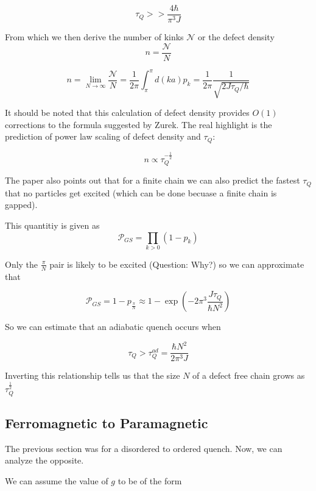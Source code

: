 \documentclass{article}
\begin{document}
\begin{equation}
    \tau_Q >> \frac{4\hbar }{\pi^3 J}
\end{equation}

From which we then derive the number of kinks $\mathcal{N}$ or the defect density $$n = \frac{\mathcal{N}}{N}$$

\begin{equation}
    n = \lim_{N \to \infty} \frac{\mathcal{N}}{N} = \frac{1}{2\pi} \int ^{\pi}_{\pi} d(ka) p_k = \frac{1}{2\pi} \frac{1}{\sqrt{2J \tau_Q/\hbar}}
\end{equation}

It should be noted that this calculation of defect density provides $O(1)$ corrections to the formula suggested by Zurek. The real highlight is the prediction of power law scaling of defect density and $\tau_Q$:

$$n \propto \tau_Q^{-\frac{1}{2}}$$

The paper also points out that for a finite chain we can also predict the fastest $\tau_Q$ that no particles get excited (which can be done becuase a finite chain is gapped).

This quantitiy is given as 
\begin{equation}
    \mathcal{P}_{GS} = \prod_{k>0} (1-p_k)
\end{equation}

Only the $\frac{\pi}{N}$ pair is likely to be excited (Question: Why?) so we can approximate that 

\begin{equation}
    \mathcal{P}_{GS} = 1- p_{\frac{\pi}{N}} \approx 1 - \exp(-2 \pi^3 \frac{J \tau_Q}{\hbar N^2})
\end{equation}

So we can estimate that an adiabatic quench occurs when 

$$\tau_Q > \tau_Q^{ad} = \frac{\hbar N^2}{2 \pi^3 J}$$

Inverting this relationship tells us that the size $N$ of a defect free chain grows as $\tau_Q^{\frac{1}{2}}$


\subsection{Ferromagnetic to Paramagnetic}

The previous section was for a disordered to ordered quench. Now, we can analyze the opposite.

We can assume the value of $g$ to be of the form 
\end{document}
